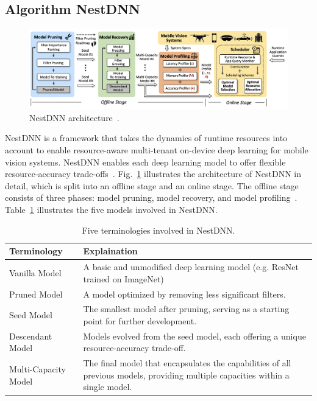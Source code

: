 \documentclass{article}
\begin{document}
\subsection{Algorithm NestDNN}\label{nestdnn}
\begin{figure}[htbp]
	\centering
	\includegraphics[width=1\linewidth]{figure/nestdnn_arch.png}
	\caption{NestDNN architecture~\cite{fang2018nestdnn}.}
	\label{nestdnn_arch}
\end{figure}

NestDNN is a framework that takes the dynamics of runtime resources into account to enable resource-aware multi-tenant on-device deep learning for mobile vision systems. NestDNN enables each deep learning model to offer flexible resource-accuracy trade-offs~\cite{fang2018nestdnn}. Fig.~\ref{nestdnn_arch} illustrates the architecture of NestDNN in detail, which is split into an offline stage and an online stage. The offline stage consists of three phases: model pruning, model recovery, and model profiling~\cite{fang2018nestdnn}. Table~\ref{nest-table} illustrates the five models involved in NestDNN.

\begin{table}[htbp]
	\centering
	\caption{Five terminologies involved in NestDNN.}
	\label{nest-table}
	\centering
	\begin{tabular}{|p{3cm}|p{10cm}|}
		\hline
		\textbf{Terminology} & \textbf{Explaination} \\
		\hline
		Vanilla Model&A basic and unmodified deep learning model (e.g. ResNet trained on ImageNet)\\
		\hline
		Pruned Model&A model optimized by removing less significant filters.\\
		\hline
		Seed Model&The smallest model after pruning, serving as a starting point for further development.\\
		\hline
		Descendant Model&Models evolved from the seed model, each offering a unique resource-accuracy trade-off.\\
		\hline
		Multi-Capacity Model&The final model that encapsulates the capabilities of all previous models, providing multiple capacities within a single model.\\
		\hline
	\end{tabular} 
\end{table}	
\end{document}
